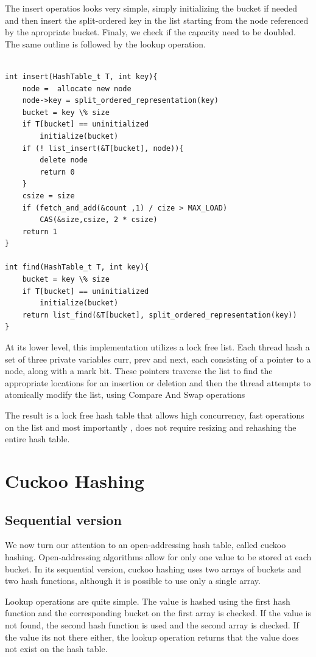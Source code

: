 The insert operatios looks very simple, simply initializing the bucket if needed and then insert the split-ordered key in the list starting from the node referenced by the apropriate bucket. Finaly, we check if the capacity need to be doubled. The same outline is followed by the lookup operation.

\begin{lstlisting}

int insert(HashTable_t T, int key){
	node =  allocate new node
	node->key = split_ordered_representation(key)
	bucket = key \% size
	if T[bucket] == uninitialized
		initialize(bucket)
	if (! list_insert(&T[bucket], node)){
		delete node
		return 0
	}
	csize = size
	if (fetch_and_add(&count ,1) / cize > MAX_LOAD)
		CAS(&size,csize, 2 * csize)
	return 1
}

int find(HashTable_t T, int key){
	bucket = key \% size
	if T[bucket] == uninitialized
		initialize(bucket)
	return list_find(&T[bucket], split_ordered_representation(key))
}

\end{lstlisting}

At its lower level, this implementation utilizes a lock free list. Each thread hash a set of three private variables curr, prev and next, each consisting of a pointer to a node, along with a mark bit. These pointers traverse the list to find the appropriate locations for an insertion or deletion and then the thread attempts to atomically modify the list, using Compare And Swap operations

The result is a lock free hash table that allows high concurrency, fast operations on the list and most importantly , does not require resizing and rehashing the entire hash table.

\section{Cuckoo Hashing}
\subsection{Sequential version}

We now turn our attention to an open-addressing hash table, called cuckoo hashing. Open-addressing algorithms allow for only one value to be stored at each bucket. In its sequential version, cuckoo hashing uses two arrays of buckets and two hash functions, although it is possible to use only a single array. 

Lookup operations are quite simple. The value is hashed using the first hash function and the corresponding bucket on the first array is checked. If the value is not found, the second hash function is used and the second array is  checked.  If the value its not there either, the lookup operation returns that the value does not exist on the hash table.

